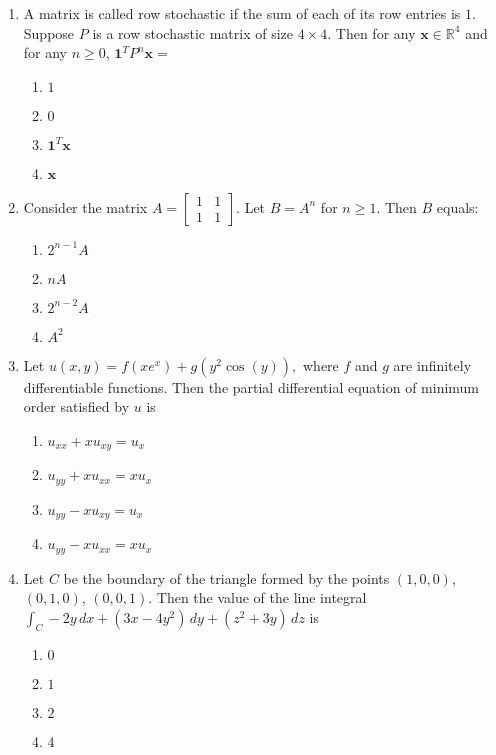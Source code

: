 \documentclass[journal]{IEEEtran}
\newcommand{\brak}[1]{\left( #1 \right)}
\begin{document}
\begin{enumerate}
  \item A matrix is called row stochastic if the sum of each of its row entries is $1$. Suppose $P$ is a row stochastic matrix of size $4 \times 4$. Then for any $\mathbf{x} \in \mathbb{R}^4$ and for any $n \geq 0$,
  $
  \mathbf{1}^T P^n \mathbf{x} =
  $
    \begin{enumerate}
      \item $1$
      \item $0$
      \item $\mathbf{1}^T \mathbf{x}$
      \item $\mathbf{x}$
    \end{enumerate}

  \item Consider the matrix $A = \begin{bmatrix}
        1 & 1 \\
        1 & 1
      \end{bmatrix}$. Let $B = A^n$ for $n \geq 1$. Then $B$ equals:
    \begin{enumerate}
      \item $2^{n-1} A$
      \item $nA$
      \item $2^{n-2} A$
      \item $A^2$
    \end{enumerate}

\item Let
  $u\brak{x,y}=f\brak{xe^{x}} + g\brak{y^2\cos\brak{y}},$
  where $f$ and $g$ are infinitely differentiable functions. Then the partial differential
  equation of minimum order satisfied by $u$ is  

  \begin{enumerate}
    \item $u_{xx} + x u_{xy} = u_{x}$
    \item $u_{yy} + x u_{xx} = x u_{x}$
    \item $u_{yy} - x u_{xy} = u_{x}$
    \item $u_{yy} - x u_{xx} = x u_{x}$
  \end{enumerate}

\item Let $C$ be the boundary of the triangle formed by the points $\brak{1,0,0}$, $\brak{0,1,0}$, $\brak{0,0,1}$. Then the value of the line integral
  $
  \int_C -2y\, dx + \brak{3x - 4y^2}\, dy + \brak{z^2 + 3y}\, dz
  $
  is

  \begin{enumerate}
    \item $0$
    \item $1$
    \item $2$
    \item $4$
  \end{enumerate}


\end{enumerate}
\end{document}

